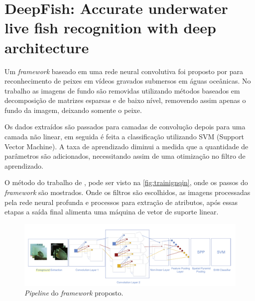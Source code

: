 
\section{DeepFish: Accurate underwater live fish recognition with deep architecture}

Um \textit{framework} baseado em uma rede neural convolutiva foi proposto por  para reconhecimento de peixes em vídeos gravados submersos em águas oceânicas. No trabalho as imagens de fundo são removidas utilizando métodos baseados em decomposição de matrizes esparsas e de baixo nível, removendo assim apenas o fundo da imagem, deixando somente o peixe.

Os dados extraídos são passados para camadas de convolução depois para uma camada não linear, em seguida é feita a classificação utilizando SVM (Support Vector Machine)\cite{cortes1995support}. A taxa de aprendizado diminui a medida que a quantidade de parâmetros são adicionados, necessitando assim de uma otimização no filtro de aprendizado. 

O método do trabalho de , pode ser visto na \autoref{fig:trainignqin}, onde os passos do \textit{framework} são mostrados. Onde os filtros são escolhidos, as imagens processadas pela rede neural profunda e processos para extração de atributos, após essas etapas a saída final alimenta uma máquina de vetor de suporte linear.
\begin{figure}[h]
	\caption{\label{fig:trainignqin}\textit{Pipeline} do \textit{framework} proposto.}
	\begin{center}
	    \includegraphics[width=1\textwidth]{resources/trainingqin}
	\end{center}
\end{figure}
   

